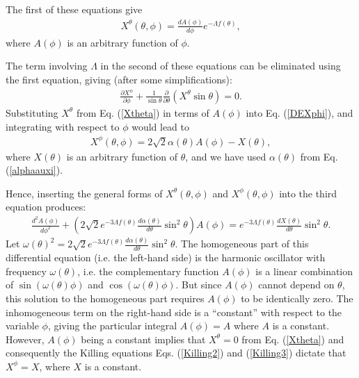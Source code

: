 \documentclass[aps,pre,preprint,superscriptaddress,showpacs,showkeys]{revtex4-1}
\begin{document}
The first of these equations give
\begin{eqnarray}\label{Xtheta}
X^\theta(\theta,\phi)=\frac{dA(\phi)}{d\phi}e^{-\Lambda f(\theta)},
\end{eqnarray}
where $A(\phi)$ is an arbitrary function of $\phi$.

The term involving $\Lambda$ in the second of these equations can be eliminated using the first equation, giving (after some simplifications):
\begin{eqnarray}\label{DEXphi}
\frac{\partial X^\phi}{\partial\phi}+\frac{1}{\sin{\theta}}\frac{\partial}{\partial\theta}\left(X^\theta\sin{\theta}\right)=0.
\end{eqnarray}
Substituting $X^\theta$ from Eq. (\ref{Xtheta}) in terms of $A(\phi)$ into Eq. (\ref{DEXphi}), and integrating with respect to $\phi$ would lead to
\begin{eqnarray}
X^\phi(\theta,\phi)=2\sqrt{2}\alpha(\theta)A(\phi)-X(\theta),
\end{eqnarray}
where $X(\theta)$ is an arbitrary function of $\theta$, and we have used $\alpha(\theta)$ from Eq. (\ref{alphaauxi}).

Hence, inserting the general forms of $X^\theta(\theta,\phi)$ and $X^\phi(\theta,\phi)$ into the third equation produces:
\begin{eqnarray}\label{harmonic}
\frac{d^2A(\phi)}{d\phi^2}+\left(2\sqrt{2}e^{-3\Lambda f(\theta)}\frac{d\alpha(\theta)}{d\theta}\sin^2{\theta}\right)A(\phi)=e^{-3\Lambda f(\theta)}\frac{dX(\theta)}{d\theta}\sin^2{\theta}.
\end{eqnarray}
Let $\displaystyle\omega(\theta)^2=2\sqrt{2}e^{-3\Lambda f(\theta)}\frac{d\alpha(\theta)}{d\theta}\sin^2{\theta}$. The homogeneous part of this differential equation (i.e. the left-hand side) is the harmonic oscillator with frequency $\omega(\theta)$, i.e. the complementary function $A(\phi)$ is a linear combination of $\sin{(\omega(\theta)\phi)}$ and $\cos{(\omega(\theta)\phi)}$. But since $A(\phi)$ cannot depend on $\theta$, this solution to the homogeneous part requires $A(\phi)$ to be identically zero. The inhomogeneous term on the right-hand side is a ``constant'' with respect to the variable $\phi$, giving the particular integral $A(\phi)=A$ where $A$ is a constant. However, $A(\phi)$ being a constant implies that $X^\theta=0$ from Eq. (\ref{Xtheta}) and consequently the Killing equations Eqs. (\ref{Killing2}) and (\ref{Killing3}) dictate that $X^\phi=X$, where $X$ is a constant.
\end{document}
